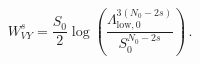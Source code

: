 \begin{equation}
W_{VY}^s = \frac{S_0}{2} \log\left( \frac{\Lambda^{3(N_0-2s)}_{\mathrm{low,0}}}{S_0^{N_0-2s}} \right) \,.
\end{equation}

